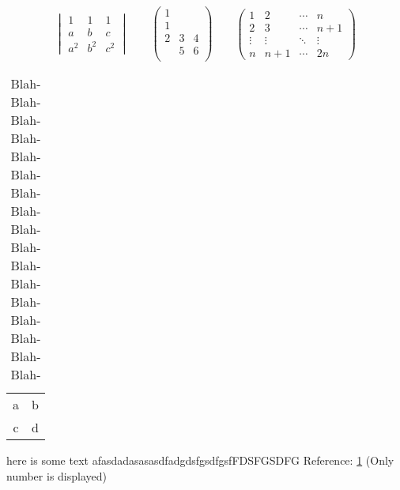 \[
\begin{vmatrix}
    1&1&1\\
    a&b&c\\
    a^2&b^2&c^2
\end{vmatrix}
\qquad
\begin{pmatrix}
    1\\
    1&&\\
    2&3&4\\
    &5&6\\
\end{pmatrix}
\qquad
\begin{pmatrix}
    1&2&\cdots&n\\
    2&3&\cdots&n+1\\
    \vdots&\vdots&\ddots&\vdots\\
    n&n+1&\cdots&2n
\end{pmatrix}
\]

\pagebreak

\blindtext
\begin{table}[p]
    \centering
    \caption[Blah-Blah]{Blah-Blah-Blah-Blah-Blah-Blah-Blah-Blah-Blah-Blah-Blah-Blah-Blah-Blah-Blah-Blah-Blah-}
    \label{tab:my_label}
    \begin{tabular}{c|c}
        a&b  \\
        c&d
    \end{tabular}
\end{table}
\blindtext[3]
\pagebreak
\listoftables

here is some text afasdadasasasdfadgdsfgsdfgsfFDSFGSDFG Reference: \ref{tab:my_label} (Only number is displayed)